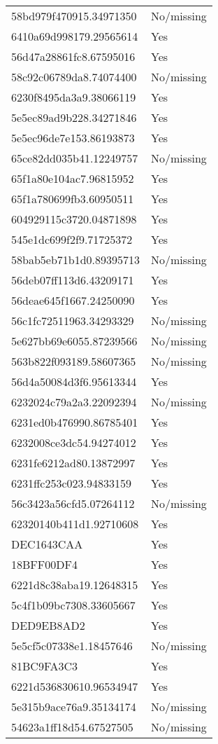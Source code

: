 \begin{tabular}{ll}
58bd979f470915.34971350 & No/missing \\
6410a69d998179.29565614 & Yes \\
56d47a28861fc8.67595016 & Yes \\
58c92c06789da8.74074400 & No/missing \\
6230f8495da3a9.38066119 & Yes \\
5e5ec89ad9b228.34271846 & Yes \\
5e5ec96de7e153.86193873 & Yes \\
65ce82dd035b41.12249757 & No/missing \\
65f1a80e104ac7.96815952 & Yes \\
65f1a780699fb3.60950511 & Yes \\
604929115c3720.04871898 & Yes \\
545e1dc699f2f9.71725372 & Yes \\
58bab5eb71b1d0.89395713 & No/missing \\
56deb07ff113d6.43209171 & Yes \\
56deae645f1667.24250090 & Yes \\
56c1fc72511963.34293329 & No/missing \\
5e627bb69e6055.87239566 & No/missing \\
563b822f093189.58607365 & No/missing \\
56d4a50084d3f6.95613344 & Yes \\
6232024c79a2a3.22092394 & No/missing \\
6231ed0b476990.86785401 & Yes \\
6232008ce3dc54.94274012 & Yes \\
6231fe6212ad80.13872997 & Yes \\
6231ffc253c023.94833159 & Yes \\
56c3423a56cfd5.07264112 & No/missing \\
62320140b411d1.92710608 & Yes \\
DEC1643CAA & Yes \\
18BFF00DF4 & Yes \\
6221d8c38aba19.12648315 & Yes \\
5c4f1b09bc7308.33605667 & Yes \\
DED9EB8AD2 & Yes \\
5e5cf5c07338e1.18457646 & No/missing \\
81BC9FA3C3 & Yes \\
6221d536830610.96534947 & Yes \\
5e315b9ace76a9.35134174 & No/missing \\
54623a1ff18d54.67527505 & No/missing \\

\end{tabular}
